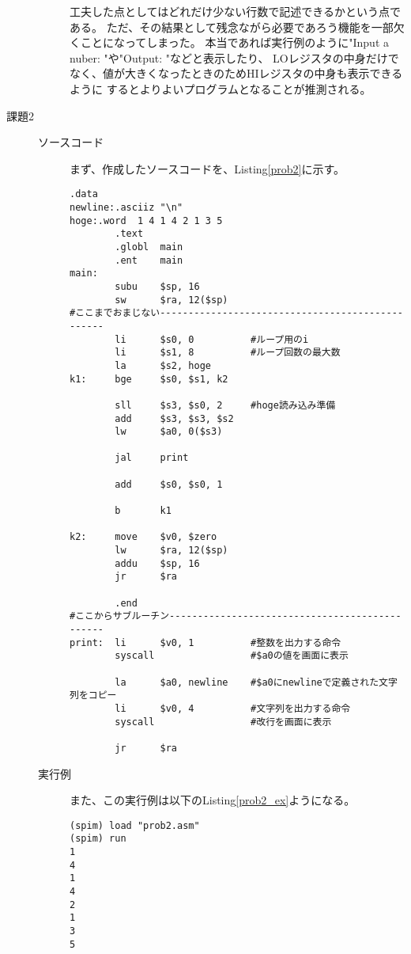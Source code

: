 \documentclass{jsarticle}
\begin{document}
\begin{description}
\begin{description}
            工夫した点としてはどれだけ少ない行数で記述できるかという点である。
            ただ、その結果として残念ながら必要であろう機能を一部欠くことになってしまった。
            本当であれば実行例のように"Input a nuber: "や"Output: "などと表示したり、
            LOレジスタの中身だけでなく、値が大きくなったときのためHIレジスタの中身も表示できるように
            するとよりよいプログラムとなることが推測される。
            \\
        \end{description}

        \item[課題2]
        \begin{description}
            \item[ソースコード]
            まず、作成したソースコードを、Listing\ref{prob2}に示す。
            \begin{lstlisting}[caption=課題2のソースコード, label=prob2]
        .data
newline:.asciiz "\n"
hoge:.word  1 4 1 4 2 1 3 5
        .text
        .globl  main
        .ent    main
main:
        subu    $sp, 16
        sw      $ra, 12($sp)
#ここまでおまじない-------------------------------------------------
        li      $s0, 0          #ループ用のi
        li      $s1, 8          #ループ回数の最大数
        la      $s2, hoge
k1:     bge     $s0, $s1, k2

        sll     $s3, $s0, 2     #hoge読み込み準備
        add     $s3, $s3, $s2
        lw      $a0, 0($s3)

        jal     print

        add     $s0, $s0, 1

        b       k1

k2:     move    $v0, $zero
        lw      $ra, 12($sp)
        addu    $sp, 16
        jr      $ra

        .end
#ここからサブルーチン-----------------------------------------------
print:  li      $v0, 1          #整数を出力する命令
        syscall                 #$a0の値を画面に表示

        la      $a0, newline    #$a0にnewlineで定義された文字列をコピー
        li      $v0, 4          #文字列を出力する命令
        syscall                 #改行を画面に表示

        jr      $ra
            \end{lstlisting}

            \item[実行例]
            また、この実行例は以下のListing\ref{prob2_ex}ようになる。
            \begin{lstlisting}[caption=課題2の実行例, label=prob2_ex]
(spim) load "prob2.asm"
(spim) run
1
4
1
4
2
1
3
5
            \end{lstlisting}


\end{description}
\end{description}
\end{document}
